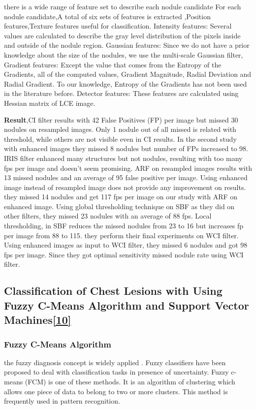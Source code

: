 \documentclass[hidelinks,12pt]{article}
\begin{document}
there is a wide range of feature set to describe each nodule candidate For each nodule candidate,A total of six sets of features is extracted ,Position features,Texture features useful for classification. Intensity features: Several values are calculated to describe the gray level distribution of the pixels inside and outside of the nodule region. Gaussian features: Since we do not have a prior knowledge about the size of the nodules, we use the multi-scale Gaussian filter, Gradient features: Except the value that comes from the Entropy of the Gradients, all of the computed values, Gradient Magnitude, Radial Deviation and Radial Gradient. To our knowledge, Entropy of the Gradients has not been used in the literature before. Detector features: These features are calculated using Hessian matrix of LCE image.

\textbf{Result},CI filter results with 42 False Positives (FP) per image but missed 30 nodules on resampled images. Only 1 nodule out of all missed is related with threshold, while others are not visible even in CI results. In the second study with enhanced images they missed 8 nodules but number of FPs increased to 98. IRIS filter enhanced many structures but not nodules, resulting with too many fps per image and doesn’t seem promising. ARF on resampled images results with 13 missed nodules and an average of 95 false positive per image. Using enhanced image instead of resampled image does not provide any improvement on results. they missed 14 nodules and get 117 fps per image on our study with ARF on enhanced image. Using global thresholding technique on SBF as they did on other filters, they missed 23 nodules with an average of 88 fps. Local thresholding, in SBF reduces the missed nodules from 23 to 16 but increases fp per image from 88 to 115. they perform their final experiments on WCI filter. Using enhanced images as input to WCI filter, they missed 6 nodules and got 98 fps per image. Since they got optimal sensitivity missed nodule rate using WCI filter.


\subsection{Classification of Chest Lesions with Using Fuzzy
C-Means Algorithm and Support Vector Machines\hyperref[10]{[10]}}

\subsubsection{Fuzzy C-Means Algorithm}
the fuzzy diagnosis concept is widely applied . Fuzzy classifiers
have been proposed to deal with classification tasks in presence of uncertainty. Fuzzy
c-means (FCM) is one of these methods. It is an algorithm of clustering which allows
one piece of data to belong to two or more clusters. This method is frequently used in pattern recognition.
\end{document}
